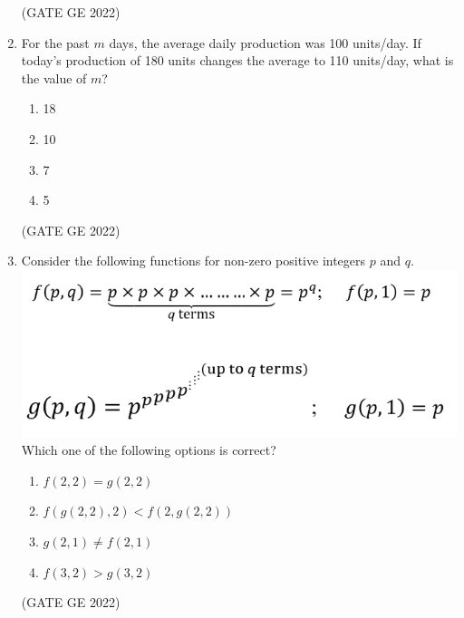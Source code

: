 \documentclass[journal,12pt,onecolumn]{IEEEtran}
\theoremstyle{remark}
\begin{document}
\begin{enumerate}
\hfill (GATE GE 2022)

\item For the past $m$ days, the average daily production was 100 units/day. If today’s production of 180 units changes the average to 110 units/day, what is the value of $m$?
\begin{enumerate}
    \item 18
    \item 10
    \item 7
    \item 5
\end{enumerate}

\hfill (GATE GE 2022)

\item Consider the following functions for non-zero positive integers $p$ and $q$.
\centering \includegraphics[width=\columnwidth]{figs/fig_8.png}
Which one of the following options is correct?
\begin{enumerate}
    \item $f(2,2) = g(2,2)$
    \item $f(g(2,2), 2) < f(2, g(2,2))$
    \item $g(2,1) \ne f(2,1)$
    \item $f(3,2) > g(3,2)$
\end{enumerate}

\hfill (GATE GE 2022)


\end{enumerate}
\end{document}
